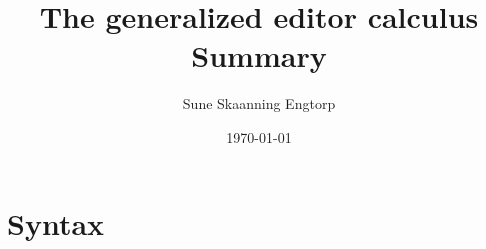 \documentclass{article}
\title{The generalized editor calculus \\ Summary}
\date{\today}
\author{Sune Skaanning Engtorp}
\begin{document}
\maketitle

\section{Syntax}



\printbibliography
\end{document}
